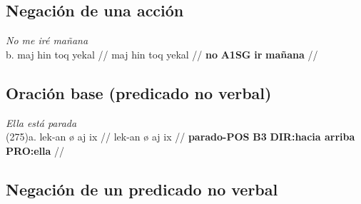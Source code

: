 \documentclass{article}%
\begin{document}
\subsection{Negación de una acción}%
\label{subsec:Negacindeunaaccin}%

%
\par\medskip%
\ex
\textit{No me iré mañana} \\
\begingl
\gla b. maj hin toq yekal //
\glb maj hin toq yekal //
\glc \textbf{no} \textbf{A1SG} \textbf{ir} \textbf{mañana} //
\endgl
\xe
%
\medskip%
\subsection{Oración base (predicado no verbal)}%
\label{subsec:Oracinbase(predicadonoverbal)}%

%
\par\medskip%
\ex
\textit{Ella está parada} \\
\begingl
\gla (275)a. lek-an ø aj ix //
\glb lek-an ø aj ix //
\glc \textbf{parado-}\textbf{POS} \textbf{B3} \textbf{DIR:hacia arriba} \textbf{PRO:ella} //
\endgl
\xe
%
\medskip%
\subsection{Negación de un predicado no verbal}%
\label{subsec:Negacindeunpredicadonoverbal}%

%
\end{document}
